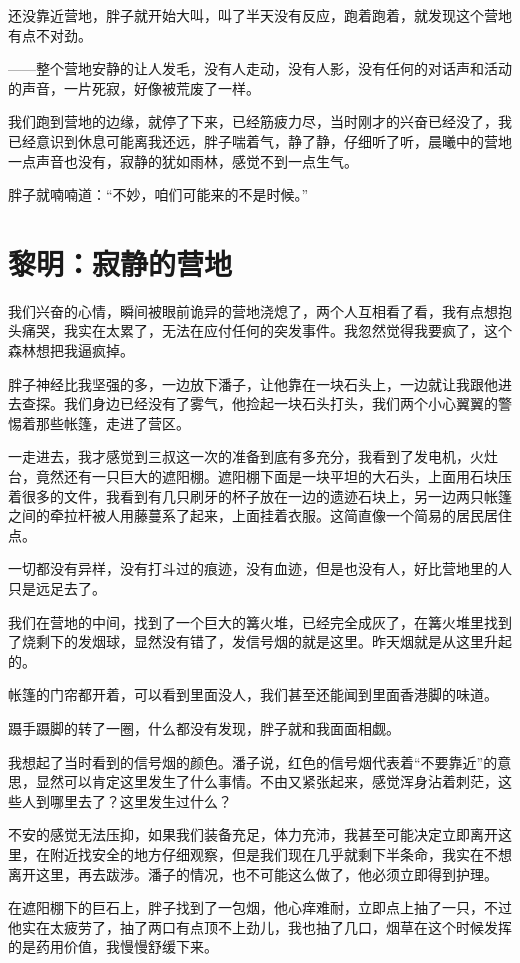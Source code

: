 还没靠近营地，胖子就开始大叫，叫了半天没有反应，跑着跑着，就发现这个营地有点不对劲。

——整个营地安静的让人发毛，没有人走动，没有人影，没有任何的对话声和活动的声音，一片死寂，好像被荒废了一样。

我们跑到营地的边缘，就停了下来，已经筋疲力尽，当时刚才的兴奋已经没了，我已经意识到休息可能离我还远，胖子喘着气，静了静，仔细听了听，晨曦中的营地一点声音也没有，寂静的犹如雨林，感觉不到一点生气。

胖子就喃喃道：“不妙，咱们可能来的不是时候。”

\chapter{黎明：寂静的营地}

我们兴奋的心情，瞬间被眼前诡异的营地浇熄了，两个人互相看了看，我有点想抱头痛哭，我实在太累了，无法在应付任何的突发事件。我忽然觉得我要疯了，这个森林想把我逼疯掉。

胖子神经比我坚强的多，一边放下潘子，让他靠在一块石头上，一边就让我跟他进去查探。我们身边已经没有了雾气，他捡起一块石头打头，我们两个小心翼翼的警惕着那些帐篷，走进了营区。

一走进去，我才感觉到三叔这一次的准备到底有多充分，我看到了发电机，火灶台，竟然还有一只巨大的遮阳棚。遮阳棚下面是一块平坦的大石头，上面用石块压着很多的文件，我看到有几只刷牙的杯子放在一边的遗迹石块上，另一边两只帐篷之间的牵拉杆被人用藤蔓系了起来，上面挂着衣服。这简直像一个简易的居民居住点。

一切都没有异样，没有打斗过的痕迹，没有血迹，但是也没有人，好比营地里的人只是远足去了。

我们在营地的中间，找到了一个巨大的篝火堆，已经完全成灰了，在篝火堆里找到了烧剩下的发烟球，显然没有错了，发信号烟的就是这里。昨天烟就是从这里升起的。

帐篷的门帘都开着，可以看到里面没人，我们甚至还能闻到里面香港脚的味道。

蹑手蹑脚的转了一圈，什么都没有发现，胖子就和我面面相觑。

我想起了当时看到的信号烟的颜色。潘子说，红色的信号烟代表着“不要靠近”的意思，显然可以肯定这里发生了什么事情。不由又紧张起来，感觉浑身沾着刺茫，这些人到哪里去了？这里发生过什么？

不安的感觉无法压抑，如果我们装备充足，体力充沛，我甚至可能决定立即离开这里，在附近找安全的地方仔细观察，但是我们现在几乎就剩下半条命，我实在不想离开这里，再去跋涉。潘子的情况，也不可能这么做了，他必须立即得到护理。

在遮阳棚下的巨石上，胖子找到了一包烟，他心痒难耐，立即点上抽了一只，不过他实在太疲劳了，抽了两口有点顶不上劲儿，我也抽了几口，烟草在这个时候发挥的是药用价值，我慢慢舒缓下来。


